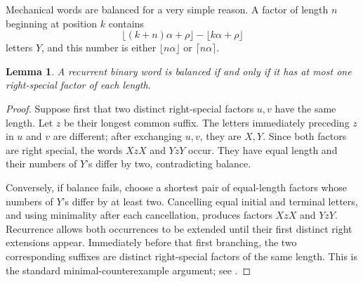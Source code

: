 \documentclass{book}
\newtheorem{lemma}[definition]{Lemma}
\begin{document}
Mechanical words are balanced for a very simple reason.  A factor of length
\(n\) beginning at position \(k\) contains
\[
  \lfloor(k+n)\alpha+\rho\rfloor
  -\lfloor k\alpha+\rho\rfloor
\]
letters \(Y\), and this number is either \(\lfloor n\alpha\rfloor\) or
\(\lceil n\alpha\rceil\).

\begin{lemma}\label{lemma:BalanceSpecialFactors}
  A recurrent binary word is balanced if and only if it has at most one
  right-special factor of each length.
\end{lemma}
\begin{proof}
  Suppose first that two distinct right-special factors \(u,v\) have the
  same length.  Let \(z\) be their longest common suffix.  The letters
  immediately preceding \(z\) in \(u\) and \(v\) are different; after
  exchanging \(u,v\), they are \(X,Y\).  Since both factors are right
  special, the words \(XzX\) and \(YzY\) occur.  They have equal length and
  their numbers of \(Y\)'s differ by two, contradicting balance.

  Conversely, if balance fails, choose a shortest pair of equal-length
  factors whose numbers of \(Y\)'s differ by at least two.  Cancelling
  equal initial and terminal letters, and using minimality after each
  cancellation, produces factors \(XzX\) and \(YzY\).  Recurrence allows
  both occurrences to be extended until their first distinct right
  extensions appear.  Immediately before that first branching, the two
  corresponding suffixes are distinct right-special factors of the same
  length.  This is the standard minimal-counterexample argument; see
  \cite[Section~2.1]{Lothaire2002}.
\end{proof}
\end{document}
